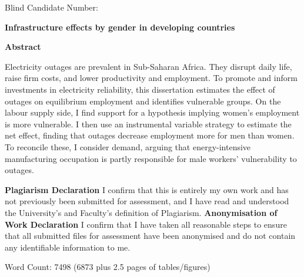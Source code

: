 \documentclass[12pt]{article}
\begin{document}
\onehalfspacing
\begin{titlepage} \noindent
    Blind Candidate Number: \par
        \begin{centering}
    {\vspace*{6cm}\huge \textbf{Infrastructure effects by gender in developing countries}
    }\par
    \vspace{3cm}
    \noindent
    \textbf{\large{Abstract}} \par
    \noindent Electricity outages are prevalent in Sub-Saharan Africa. They disrupt daily life, raise firm costs, and lower productivity and employment. To promote and inform investments in electricity reliability, this dissertation estimates the effect of outages on equilibrium employment and identifies vulnerable groups. On the labour supply side, I find support for a hypothesis implying women’s employment is more vulnerable. I then use an instrumental variable strategy to estimate the net effect, finding that outages decrease employment more for men than women. To reconcile these, I consider demand, arguing that energy-intensive manufacturing occupation is partly responsible for male workers' vulnerability to outages. \end{centering}
        \vspace{1cm}
    \newline
    \textbf{Plagiarism Declaration} \newline
I confirm that this is entirely my own work and has not previously been submitted for assessment, and I have read and understood the University’s and Faculty’s definition of Plagiarism.
\newline
\textbf{Anonymisation of Work Declaration} \newline
I confirm that I have taken all reasonable steps to ensure that all submitted files for assessment have been anonymised and do not contain any identifiable information to me.
        \vspace{0.8cm} \par \noindent
Word Count: 7498 (6873 plus 2.5 pages of tables/figures)
    \vspace{1em}
    \begin{minipage}{0.8\textwidth}
        \small 
    \end{minipage}
\end{titlepage}
\end{document}
